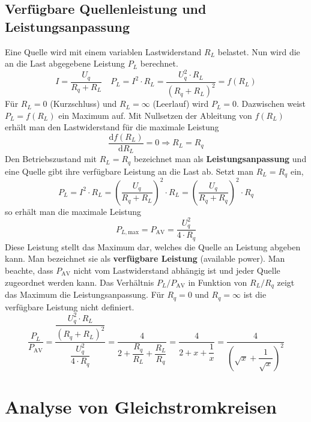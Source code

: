 \subsection{Verfügbare Quellenleistung und Leistungsanpassung}
Eine Quelle wird mit einem variablen Lastwiderstand $R_L$ belastet. Nun wird die an die Last abgegebene Leistung $P_L$ berechnet.
\begin{equation}
\boxed{I=\dfrac{U_q}{R_q+R_L}}\quad \boxed{P_L=I^2\cdot R_L=\dfrac{U_q^2\cdot R_L}{\left(R_q+R_L\right)^2}=f\left(R_L\right)}
\end{equation}
Für $R_L=0$ (Kurzschluss) und $R_L=\infty$ (Leerlauf) wird $P_L=0$. Dazwischen weist $P_L=f\left(R_L\right)$ ein Maximum auf. Mit Nullsetzen der Ableitung von $f\left(R_L\right)$ erhält man den Lastwiderstand für die maximale Leistung
\begin{equation}
\boxed{\dfrac{\text{d}f\left(R_L\right)}{\text{d}R_L}=0\Longrightarrow R_L=R_q}
\end{equation}
Den Betriebszustand mit $R_L=R_q$ bezeichnet man als \textbf{Leistungsanpassung} und eine Quelle gibt ihre verfügbare Leistung an die Last ab. Setzt man $R_L=R_q$ ein,
\begin{equation}
\boxed{P_L=I^2\cdot R_L=\left(\dfrac{U_q}{R_q+R_L}\right)^2\cdot R_L=\left(\dfrac{U_q}{R_q+R_q}\right)^2\cdot R_q}
\end{equation}
so erhält man die maximale Leistung
\begin{equation}
\boxed{P_{L,\text{max}}=P_{\text{AV}}=\dfrac{U_q^2}{4\cdot R_q}}
\end{equation}
Diese Leistung stellt das Maximum dar, welches die Quelle an Leistung abgeben kann. Man bezeichnet sie als \textbf{verfügbare Leistung} (available power). Man beachte, dass $P_{\text{AV}}$ nicht vom Lastwiderstand abhängig ist und jeder Quelle zugeordnet werden kann.
\newline\newline
Das Verhältnis $P_L/P_{\text{AV}}$ in Funktion von $R_L/R_q$ zeigt das Maximum die Leistungsanpassung. Für $R_q=0$ und $R_q=\infty$ ist die verfügbare Leistung nicht definiert.
\begin{equation}
\boxed{\dfrac{P_L}{P_{\text{AV}}}=\dfrac{\dfrac{U_q^2\cdot R_L}{\left(R_q+R_L\right)^2}}{\dfrac{U_q^2}{4\cdot R_q}}=\dfrac{4}{2+\dfrac{R_q}{R_L}+\dfrac{R_L}{R_q}}=\dfrac{4}{2+x+\dfrac{1}{x}}=\dfrac{4}{\left(\sqrt{x}+\dfrac{1}{\sqrt{x}}\right)^2}}
\end{equation}
\section{Analyse von Gleichstromkreisen}
